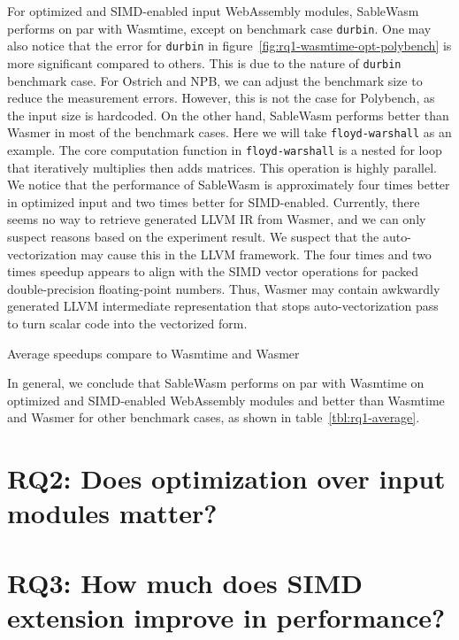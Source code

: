 For optimized and SIMD-enabled input WebAssembly modules, SableWasm performs on par with Wasmtime, except on benchmark case \texttt{durbin}. One may also notice that the error for \texttt{durbin} in figure~\ref{fig:rq1-wasmtime-opt-polybench} is more significant compared to others. This is due to the nature of \texttt{durbin} benchmark case. For Ostrich and NPB, we can adjust the benchmark size to reduce the measurement errors. However, this is not the case for Polybench, as the input size is hardcoded. On the other hand, SableWasm performs better than Wasmer in most of the benchmark cases. Here we will take \texttt{floyd-warshall} as an example. The core computation function in \texttt{floyd-warshall} is a nested for loop that iteratively multiplies then adds matrices. This operation is highly parallel. We notice that the performance of SableWasm is approximately four times better in optimized input and two times better for SIMD-enabled. Currently, there seems no way to retrieve generated LLVM IR from Wasmer, and we can only suspect reasons based on the experiment result. We suspect that the auto-vectorization may cause this in the LLVM framework. The four times and two times speedup appears to align with the SIMD vector operations for packed double-precision floating-point numbers. Thus, Wasmer may contain awkwardly generated LLVM intermediate representation that stops auto-vectorization pass to turn scalar code into the vectorized form.

\begin{table}[]
    \centering
    
    \caption{Average speedups compare to Wasmtime and Wasmer}
    \label{tbl:rq1-average}
\end{table}

In general, we conclude that SableWasm performs on par with Wasmtime on optimized and SIMD-enabled WebAssembly modules and better than Wasmtime and Wasmer for other benchmark cases, as shown in table~\ref{tbl:rq1-average}.


\section[RQ2: Does optimization over input modules matter?]{
  {\large RQ2: Does optimization over input modules matter?}}

\section[RQ3: How much does SIMD extension improve in performance?]{
  {\large RQ3: How much does SIMD extension improve in performance?}}